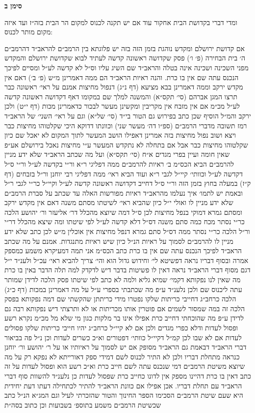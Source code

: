 \documentclass[12pt, openany]{book}
\newcommand{\chapname}{}
\newcommand{\newchap}[1]{
	\addcontentsline{toc}{chapter}{#1}
	\renewcommand{\chapname}{#1}
		\begin{center}
			\textbf{%
\fontsize{16pt}{16pt}\selectfont
				#1}
		\end{center}
}
\begin{document}
\newchap{סימן ב}
\begin{multicols}{2}
ומדי דברי בקדושת הבית אחקור עוד אם יש תקנה לכנוס למקום הר הבית בזה״ז ועד איזה מקום מותר לכנוס:\\\vspace{0pt}

אם קדושת ירושלם ומקדש נוהגת בזמן הזה בזה יש פלוגתא בין הרמב״ם להראב״ד דהרמב״ם ה׳ בית הבחירה (פ׳ ו׳) פסק שקדושה ראשונה קדשה לעתיד לבוא שקדושת ירושלם והמקדש מפני השכינה ושכינה אינה בטלה והראב״ד שם השיג עליו וס״ל לא קדשה לע״ל ומסיים לפיכך הנכנס עתה שם אין בו כרת. והנה ראיות הראב״ד הם ממה דאמרינן מ״ש (פ׳ ב׳) דאם אין מקדש ירקב וממה דאמרינן בבא מציעא (דף נ״ג) דנפול מחיצות אמנם על ראי׳ ראשונה כבר תרצו המגן אברהם (סי׳ תקס״א) והמשנה למלך שם במקומו דאף דקדושה ראשונה קדשה לע״ל מכ״מ אם אין מזבח אין מקריבין ומקשינן מעשר לבכור כדאמרינן מכות (דף י״ט) ולכן ירקב והמ״ל הוסיף שכן כתב בפירוש גם הטור בי״ד (סי׳ של״א) וגם על ראי׳ השני׳ של הראב״ד רמז תשובה מדברי הרמב״ם (ספ״ו דה׳ מעשר שני) וכוונתו דדוקא היכי שקלטוהו מחיצות כבר ויצא ושוב נפול מחיצות בזה אמרינן דאפילו הושב המעשר לתוך המקום לא יאכל שם כיון שקלטוהו מחיצות כבר אבל אם בתחלה לא נתקדש המעשר ע״י מחיצות נאכל בירושלם אע״פ שאין חומה ועיין בפרי מגדים א״ח (סי׳ תקס״א) ועל מה שכתב הראב״ד שלא ידע מניין להרמב״ם הביא הכס״מ ב׳ ראיות להרמב״ם ממה דפליגי ר״א ור״י בקדשה לע״ל ור״י ס״ל דקדשה לע״ל וכוותי׳ קיי״ל לגבי ר״א ועוד הביא ראי׳ ממה דפליגי רבי יוחנן ור״ל בזבחים (דף ק״ז) במעלה בחוץ בזמן הזה ור״י ס״ל דחייב דקדושה ראשונה קדשה לע״ל וקיי״ל כר״י לגבי ר״ל ובאמת יש לתמו׳ איך נעלמו מהראב״ד ראיות מפורשות האלה עד שכתב על סברת הרמב״ם שלא ידע מניין לו ואולי י״ל כיון שהביא ראי׳ לשיטתו מסתם משנה דאם אין מקדש ירקב ומסתם גמרא דמוקי בנפל מחיצות לכן ס״ל דמה שיוצא מהכלל דר׳ אליעזר ור׳ יהושע הלכה כר״י נסתר מכח כמה סתם משנה דס״ל דלא קדשה לע״ל לפי שיטתו ומה שיצא מהכלל דר״י ור״ל הלכה כר״י נסתר ממה דס״ל סתם גמרא דנפל מחיצות אין אוכלין מ״ש לכן כתב שלא ידע מניין לו להרמב״ם לסמוך על ראיות הנ״ל כיון שיש ראיות מתנגדות. אמנם על מה שכתב הראב״ד לפיכך הנכנס עתה שם אין בו כרת כתב הכס״מ אני תמה דמעיקרא משמע כמספק אמרה ובסוף דבריו נראה דפשיטא לי׳ וחידוש גדול הוא והי׳ צריך להביא ראי׳ עכ״ל ולענ״ד י״ל דגם מסוף דברי הראב״ד נראה דאין לו פשיטות בדבר דיש לדקדק למה תלה הדבר באין בו כרת מה שאין לנו נפקותא דקמי׳ שמיא גליא ולמה לא כתב לפי שיטתו פסק הלכה לדידן שמותר עתה ליכנוס שם ולכן נלענ״ד ע״פ מה שכתבתי בספרי ע״ל על מה דאמרינן במכות (דף כ״ג) הלכה כרחב״ג דחייבי כריתות שלקו נפטרו מידי כריתתן שהקשתי שם דמה נפקותא בפסק הלכה זה במה שמסור לשמים אם פוטרין אותו מכריתות או לא ותרצתי דיש נפקותא רבה גם לדידן ע״פ מה שהוכחתי דחייב כרת אפילו אינו בר מלקות כגון מי שלא מל מכ״מ נקרא רשע ופסול לעדות ודלא כפרי מגדים ולכן אם לא קיי״ל כרחב״ג יהיו חייבי כריתות שלקו פסולים לעדות אם לא שבו לכן קמ״ל דקיי״ל כוותי׳ דפטורים וא״כ כשרים לעדות וכן נ״ל פה בביאור דברי הראב״ד דבאמת גם הראב״ד מסופק אם יש לסמוך על ראיותיו או על ר׳ יהושע ור׳ יוחנן כנראה מתחלת דבריו ולכן לא התיר לכנוס לשם דמידי ספק דאורייתא לא נפקא רק על מה שיוצא משיטת הרמב״ם דמי שנכנס עתה לשם חייב כרת וא״כ רשע הוא ופסול לעדות על זה כתב דאין בו כרת דהיינו מספק אין לדונו כחייב כרת שפסול לעדות כן נלענ״ד להשוות סוף דברי הראב״ד עם תחלת דבריו. אכן אפילו אם כוונת הראב״ד להתיר לכתחילה דעתו דעת יחידית היא שעם שיטת הרמב״ם הסכימו הספר החינוך והטור שהזכרתי לעיל וגם המג״א הנ״ל כתב שכשיטת הרמב״ם משמע בתוספ׳ בשבועות וכן כתוב בסה״ת 
\end{multicols}
\end{document}
